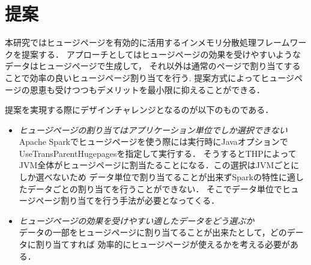 \section{提案} \label{section:proposal}
本研究ではヒュージページを有効的に活用するインメモリ分散処理フレームワークを提案する．
アプローチとしてはヒュージページの効果を受けやすいようなデータはヒュージページで生成して，
それ以外は通常のページで割り当てすることで効率の良いヒュージページ割り当てを行う.
提案方式によってヒュージページの恩恵も受けつつもデメリットを最小限に抑えることができる．

提案を実現する際にデザインチャレンジとなるのが以下のものである．

\begin{itemize}
  \item \emph{ヒュージページの割り当てはアプリケーション単位でしか選択できない}\\
  Apache Sparkでヒュージページを使う際には実行時にJavaオプションでUseTransParentHugepagesを指定して実行する．
  そうするとTHPによってJVM全体がヒュージページに割当たることになる．この選択はJVMごとにしか選べないため
  データ単位で割り当てることが出来ずSparkの特性に適したデータごとの割り当てを行うことができない．
  そこでデータ単位でヒュージページ割り当てを行う手法が必要となってくる．
  \item \emph{ヒュージページの効果を受けやすい適したデータをどう選ぶか}\\
  データの一部をヒュージページに割り当てることが出来たとして，どのデータに割り当てすれば
  効率的にヒュージページが使えるかを考える必要がある．
\end{itemize}



